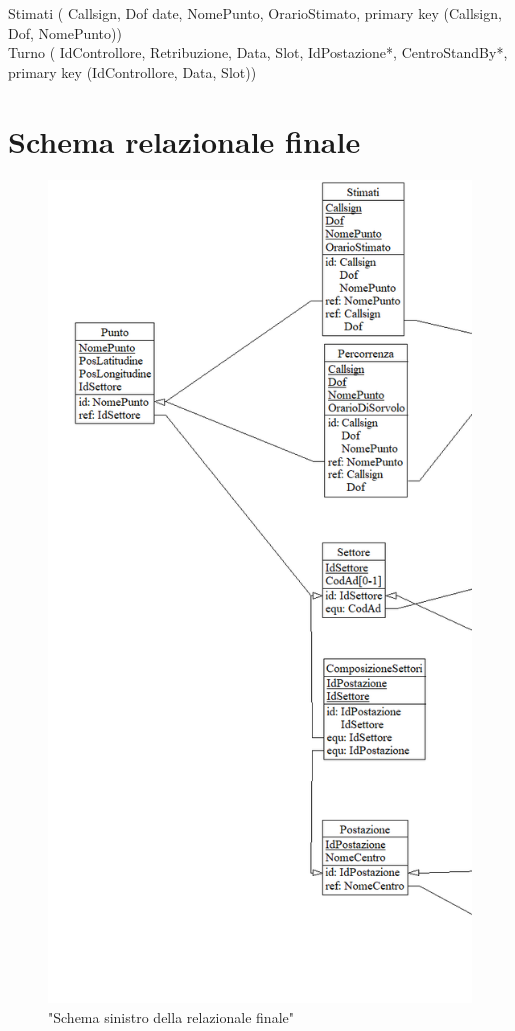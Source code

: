 Stimati (
     Callsign,
     Dof date,
     NomePunto,
     OrarioStimato,
     primary key (Callsign, Dof, NomePunto))\\

Turno (
     IdControllore,
     Retribuzione,
     Data,
     Slot,
     IdPostazione*,
     CentroStandBy*,
     primary key (IdControllore, Data, Slot))\\
\section{Schema relazionale finale}
\begin{figure}[H]
  \centering
  \includegraphics[height=1\textheight]{figures/Capture1.PNG}
  \caption{"Schema sinistro della relazionale finale"}
\end{figure}

